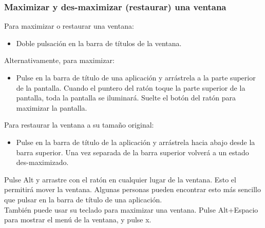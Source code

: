 \subsubsection{Maximizar y des-maximizar (restaurar) una ventana}
Para maximizar o restaurar una ventana:
\begin{itemize}
\item Doble pulsación en la barra de títulos de la ventana.
\end{itemize}
Alternativamente, para maximizar:
\begin{itemize}
\item Pulse en la barra de título de una aplicación y arrástrela a la parte superior de la pantalla. Cuando el puntero del ratón toque la parte superior de la pantalla, toda la pantalla se iluminará. Suelte el botón del ratón para maximizar la pantalla.
\end{itemize}
Para restaurar la ventana a su tamaño original:
\begin{itemize}
\item Pulse en la barra de título de la aplicación y arrástrela hacia abajo desde la barra superior. Una vez separada de la barra superior volverá a un estado des-maximizado.
\end{itemize}
Pulse Alt y arrastre con el ratón en cualquier lugar de la ventana. Esto el permitirá mover la ventana. Algunas personas pueden encontrar esto más sencillo que pulsar en la barra de título de una aplicación.\\
También puede usar su teclado para maximizar una ventana. Pulse Alt+Espacio para mostrar el menú de la ventana, y pulse x.
